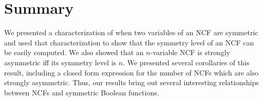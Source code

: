 \section{Summary}
\label{sec:summary}

We presented a characterization of when two variables
of an NCF are symmetric and used that characterization
to show that the symmetry level of an NCF can be easily computed.
We also showed that an $n$-variable NCF is strongly asymmetric
iff its symmetry level is $n$.
We presented several corollaries of this result, including
a closed form expression for the number of NCFs which are also
strongly asymmetric.
Thus, our results bring out several interesting relationships 
between NCFs and symmetric Boolean functions.

